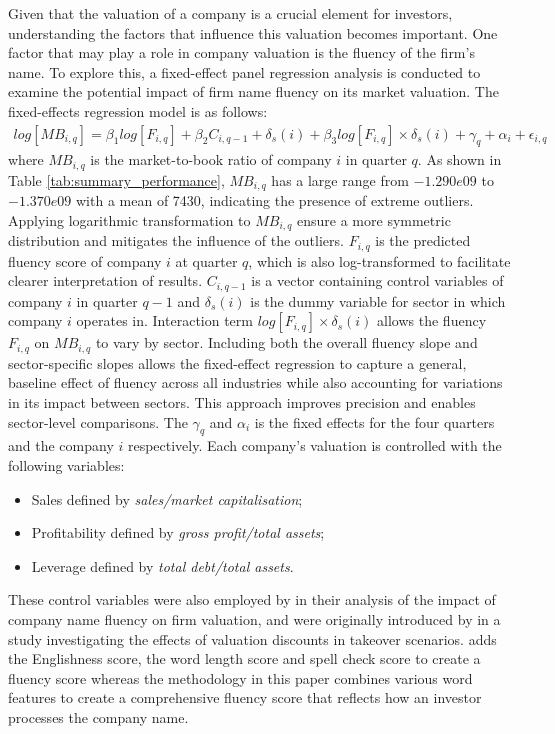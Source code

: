 \documentclass[a4paper,11pt]{report}
\begin{document}
Given that the valuation of a company is a crucial element for investors, understanding the factors that influence this valuation becomes important. One factor that may play a role in company valuation is the fluency of the firm’s name. To explore this, a fixed-effect panel regression analysis is conducted to examine the potential impact of firm name fluency on its market valuation. The fixed-effects regression model is as follows:
\begin{align}
    log \left[MB_{i,q}\right] = \beta_1log\left[F_{i,q}\right] + {\beta_2}C_{i,q-1} + \delta_s(i) + {\beta_3}log\left[F_{i,q}\right] \times \delta_s(i) + \gamma_q + \alpha_i + \epsilon_{i,q}
\end{align}
\noindent where $MB_{i,q}$ is the market-to-book ratio of company $i$ in quarter $q$. As shown in Table \ref{tab:summary_performance}, $MB_{i,q}$ has a large range from $-1.290e09$ to $-1.370e09$ with a mean of 7430, indicating the presence of extreme outliers. Applying logarithmic transformation to $MB_{i,q}$ ensure a more symmetric distribution and mitigates the influence of the outliers. $F_{i,q}$ is the predicted fluency score of company $i$ at quarter $q$, which is also log-transformed to facilitate clearer interpretation of results. $C_{i,q-1}$ is a vector containing control variables of company $i$ in quarter $q-1$ and $\delta_s(i)$ is the dummy variable for sector in which company $i$ operates in. Interaction term $log\left[F_{i,q}\right] \times \delta_s(i)$ allows the fluency $F_{i,q}$ on $MB_{i,q}$ to vary by sector. Including both the overall fluency slope and sector-specific slopes allows the fixed-effect regression to capture a general, baseline effect of fluency across all industries while also accounting for variations in its impact between sectors. This approach improves precision and enables sector-level comparisons. The $\gamma_q$ and $\alpha_i$ is the fixed effects for the four quarters and the company $i$ respectively. Each company’s valuation is controlled with the following variables:

\begin{itemize}
    \item Sales defined by \textit{sales/market capitalisation};
    \item Profitability defined by \textit{gross profit/total assets};
    \item Leverage defined by \textit{total debt/total assets}.
\end{itemize}

These control variables were also employed by  in their analysis of the impact of company name fluency on firm valuation, and were originally introduced by  in a study investigating the effects of valuation discounts in takeover scenarios.  adds the Englishness score, the word length score and spell check score to create a fluency score whereas the methodology in this paper combines various word features to create a comprehensive fluency score that reflects how an investor processes the company name. 
\end{document}
